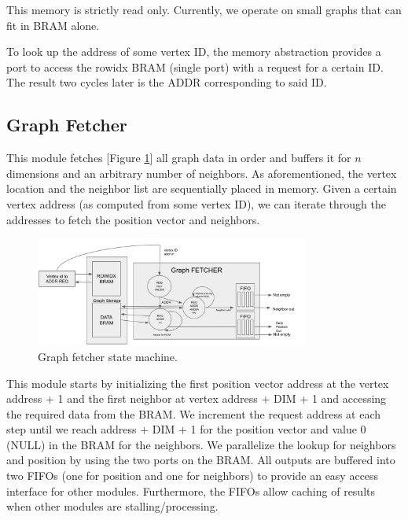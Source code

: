 \documentclass[conference]{IEEEtran}
\begin{document}
This memory is strictly read only. Currently, we operate on small graphs that can fit in BRAM alone.

To look up the address of some vertex ID, the memory abstraction provides a port to access the rowidx BRAM (single port) with a request for a certain ID. The result two cycles later is the ADDR corresponding to said ID.

\subsection{Graph Fetcher} \label{sssec:graphfetcher}

This module fetches [Figure \ref{fetchfig}] all graph data in order and buffers it for $n$ dimensions and an arbitrary number of neighbors. As aforementioned, the vertex location and the neighbor list are sequentially placed in memory. Given a certain vertex address (as computed from some vertex ID), we can iterate through the addresses to fetch the position vector and neighbors. 

\begin{figure}[htbp]
\centerline{\includegraphics[width=9cm]{fetcher.png}}
\caption{Graph fetcher state machine.}
\label{fetchfig}
\end{figure}


This module starts by initializing the first position vector address at the vertex address + 1 and the first neighbor at vertex address + DIM + 1 and accessing the required data from the BRAM. We increment the request address at each step until we reach address + DIM + 1 for the position vector and value 0 (NULL) in the BRAM for the neighbors. We parallelize the lookup for neighbors and position by using the two ports on the BRAM. All outputs are buffered into two FIFOs (one for position and one for neighbors) to provide an easy access interface for other modules. Furthermore, the FIFOs allow caching of results when other modules are stalling/processing.
\end{document}
